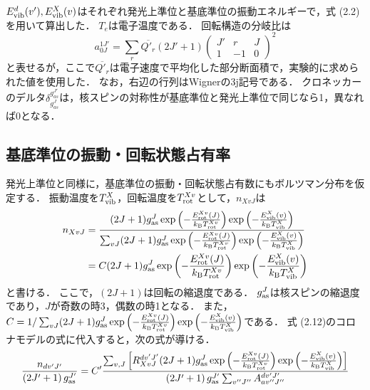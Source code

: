 $E^d_{\rm vib} (v'), E^X_{\rm vib} (v)$はそれぞれ発光上準位と基底準位の振動エネルギーで，式 (2.2)を用いて算出した．
$T_{e}$は電子温度である．
回転構造の分岐比は
\begin{equation}
    a^{1J'}_{0J} = \sum_r \overline{Q'_{r}} (2J'+1) \left( \begin{array}{ccc} J' & r & J \\ 1 & -1 & 0 \end{array} \right)^2
\end{equation}
と表せる\cite{kyokaisou}が，ここで$\overline{Q'_{r}}$は電子速度で平均化した部分断面積で，実験的に求められた値\cite{senkusya}を使用した．
なお，右辺の行列はWignerの3j記号である．
クロネッカーのデルタ$\delta^{g^{J'}_{as}}_{g^J_{as}}$は，核スピンの対称性が基底準位と発光上準位で同じなら1，異なれば0となる．

\subsection{基底準位の振動・回転状態占有率}
発光上準位と同様に，基底準位の振動・回転状態占有数にもボルツマン分布を仮定する．
振動温度を$T^X_{\rm vib}$，回転温度を$T^{Xv}_{\rm rot}$として，$n_{XvJ}$は
\begin{equation}
\begin{split}
    n_{XvJ} &= \frac{ (2J+1) g^J_{\rm as} \exp \left( - \frac{E^{Xv}_{\rm rot}(J)}{k_{\rm B} T^{Xv}_{\rm rot}} \right) \exp \left( - \frac{E^{X}_{\rm vib}(v)}{k_{\rm B} T^{X}_{\rm vib}} \right) }{\sum_{vJ} (2J+1) g^J_{\rm as} \exp \left( - \frac{E^{Xv}_{\rm rot}(J)}{k_{\rm B} T^{Xv}_{\rm rot}} \right) \exp \left( - \frac{E^{X}_{\rm vib}(v)}{k_{\rm B} T^{X}_{\rm vib}} \right)}\\
    &= C (2J+1) g^J_{\rm as} \exp \left( - \frac{E^{Xv}_{\rm rot}(J)}{k_{\rm B} T^{Xv}_{\rm rot}} \right) \exp \left( - \frac{E^{X}_{\rm vib}(v)}{k_{\rm B} T^{X}_{\rm vib}} \right)
\end{split}
\end{equation}
と書ける．
ここで，$(2J+1)$は回転の縮退度である．
$g^J_{\rm as}$は核スピンの縮退度であり，$J$が奇数の時3，偶数の時1となる．
また，$C = 1 / \sum_{vJ} (2J+1) g^J_{\rm as} \exp \left( - \frac{E^{Xv}_{\rm rot}(J)}{k_{\rm B} T^{Xv}_{\rm rot}} \right) \exp \left( - \frac{E^{X}_{\rm vib}(v)}{k_{\rm B} T^{X}_{\rm vib}} \right)$である．
式 (2.12)のコロナモデルの式に代入すると，次の式が導ける．
\begin{equation}
    \frac{n_{dv'J'}}{\left( 2J'+1 \right) g^{J'}_{\rm as}} = C' \frac{ \sum_{v, J} \left[ R^{dv'J'}_{XvJ} (2J+1) g^J_{\rm as} \exp \left( - \frac{E^{Xv}_{\rm rot}(J)}{k_{\rm B} T^{Xv}_{\rm rot}} \right) \exp \left( - \frac{E^{X}_{\rm vib}(v)}{k_{\rm B} T^{X}_{\rm vib}} \right) \right] } {\left( 2J'+1 \right) g^{J'}_{\rm as} \sum_{v''J''} A^{dv'J'}_{av''J''} }
\end{equation}

